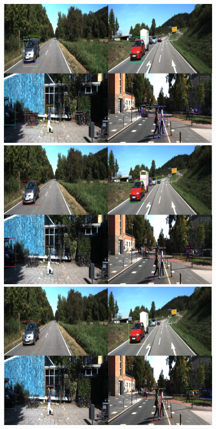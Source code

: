 \documentclass{article}
\begin{document}
\begin{figure}[h]
  \begin{minipage}{0.47\textwidth}
  \includegraphics[width=\textwidth, height=0.17\textheight]{./../../figures/1shotkitti.png}
  \end{minipage}
  \begin{minipage}{0.47\textwidth}
  \includegraphics[width=\textwidth, height=0.17\textheight]{./../../figures/5shotkitti.png}
  \end{minipage}
  \begin{minipage}{0.47\textwidth}
  \includegraphics[width=\textwidth, height=0.17\textheight]{./../../figures/10shotkitti.png}

\end{minipage}
\end{figure}
\end{document}
